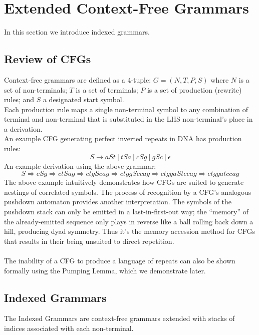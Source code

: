 \documentclass[11pt]{article}
\begin{document}
\section {Extended Context-Free Grammars}
In this section we introduce indexed grammars.
\subsection {Review of CFGs}
Context-free grammars are defined as a 4-tuple: $G = (N, T, P, S)$ where $N$ is a set of non-terminals; $T$ is a set of terminals; $P$ is a set of production (rewrite) rules;
and $S$ a designated start symbol.\\
Each production rule maps a single non-terminal symbol to any combination of terminal and non-terminal that is substituted in the LHS non-terminal's place in a derivation.\\
An example CFG generating perfect inverted repeats in DNA has production rules:
\[
 S \rightarrow aSt \ | \ tSa \ | \ cSg \ | \ gSc \ | \ \epsilon
\]
An example derivation using the above grammar:\\
\[
 S \Rightarrow cSg \Rightarrow ctSag \Rightarrow  ctgScag \Rightarrow  ctggSccag \Rightarrow  ctggaStccag \Rightarrow  ctggatccag
\]
The above example intuitively demonstrates how CFGs are suited to generate nestings of correlated symbols.
The process of recognition by a CFG's analogous pushdown automaton provides another interpretation.
The symbols of the pushdown stack can only be emitted in a last-in-first-out way; the ``memory'' of
the already-emitted sequence only plays in reverse like a ball rolling back down a hill, producing dyad symmetry.
Thus it's the memory accession method for CFGs that results in their being unsuited to direct repetition. \\ \\
The inability of a CFG to produce a language of repeats can also be shown formally using the Pumping Lemma, which we demonstrate later.
\subsection {Indexed Grammars}
The Indexed Grammars are context-free grammars extended with stacks of indices associated with each non-terminal.
\end{document}
